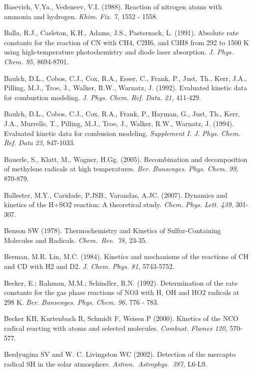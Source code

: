 \documentclass[12pt,landscape]{article}
\newcounter{reaction}
\newcounter{photo}
\begin{document}
Basevich, V.Ya., Vedeneev, V.I. (1988). Reaction of nitrogen atoms with ammonia and hydrogen. {\em Khim. Fiz. 7,} 1552 - 1558.

Balla, R.J., Casleton, K.H., Adams, J.S., Pasternack, L. (1991). Absolute rate constants for the reaction of CN with CH4, C2H6, and C3H8 from 292 to 1500 K using high-temperature photochemistry and diode laser absorption.  {\em J. Phys. Chem. 95,} 8694-8701.

Baulch, D.L., Cobos, C.J., Cox, R.A., Esser, C., Frank, P., Just, Th., Kerr, J.A., Pilling, M.J., Troe, J., Walker, R.W., Warnatz, J. (1992). Evaluated kinetic data for combustion modeling. {\em J. Phys. Chem. Ref. Data. 21,} 411-429. 

Baulch, D.L., Cobos, C.J., Cox, R.A., Frank, P., Hayman, G., Just, Th., Kerr, J.A., Murrells, T., Pilling, M.J., Troe, J., Walker, R.W., Warnatz, J. (1994).  Evaluated kinetic data for combusion modeling. {\em Supplement I. J. Phys. Chem. Ref. Data 23,} 847-1033.

Bauerle, S., Klatt, M., Wagner, H.Gg. (2005). Recombination and decomposition of methylene radicals at high temperatures. {\em Ber. Bunsenges. Phys. Chem. 99,} 870-879.

Ballester, M.Y., Caridade, P.JSB., Varandas, A.JC. (2007). Dynamics and kinetics of the H+SO2 reaction: A theoretical study. {\em Chem. Phys. Lett. 439,} 301-307.

Benson SW (1978). Thermochemistry and Kinetics of Sulfur-Containing Molecules and Radicals. {\em Chem.\ Rev.\ 78,} 23-35.

Berman, M.R. Lin, M.C. (1984). Kinetics and mechanisms of the reactions of CH and CD with H2 and D2. {\em J. Chem. Phys. 81,} 5743-5752.

Becker, E.; Rahman, M.M.; Schindler, R.N. (1992). Determination of the rate constants for the gas phase reactions of NO3 with H, OH and HO2 radicals at 298 K. {\em Ber. Bunsenges. Phys. Chem. 96,} 776 - 783.

Becker KH, Kurtenbach R, Schmidt F, Weisen P (2000). Kinetics of the NCO radical reacting with atoms and selected molecules. {\em Combust. Flames 120,} 570-577.

 Berdyugina SV and W. C. Livingston WC (2002). Detection of the mercapto radical SH in the solar atmosphere. {\em Astron.\ Astrophys.\ 387,} L6-L9.
\end{document}
